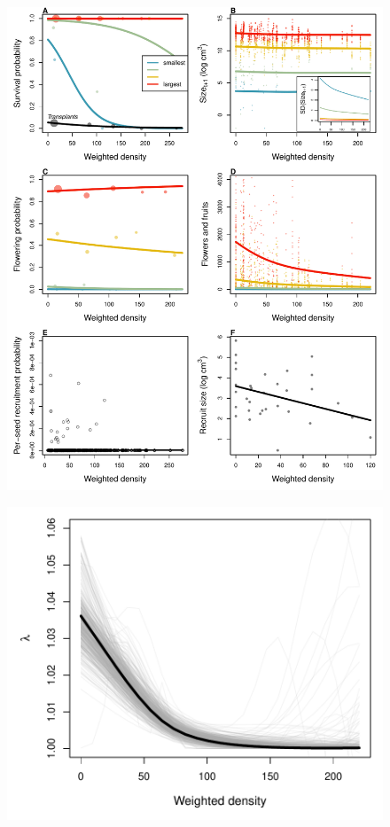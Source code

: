 \documentclass[11pt]{article}\usepackage[]{graphicx}\usepackage[usenames,dvipsnames]{xcolor}
\begin{document}
\newpage
\begin{figure}[H]
  \begin{center}
    \includegraphics[width=\linewidth]{Figures/VitalRates}
  \caption{}
  \label{fig:vital_rates}
  \end{center}
\end{figure}

\newpage
\begin{figure}[H]
  \begin{center}
    \includegraphics[width=\linewidth]{Figures/LambdaDensity}
  \caption{}
  \label{fig:lambda}
  \end{center}
\end{figure}
\end{document}

